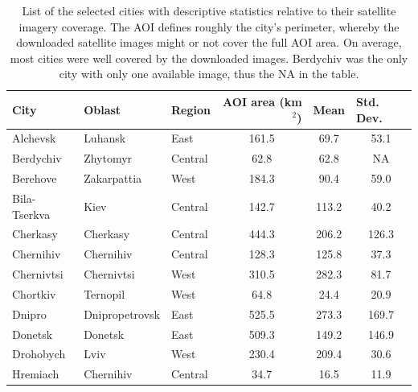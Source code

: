 \documentclass[sn-basic]{sn-jnl}%
\begin{document}
{\begin{appendices}
\begin{longtable}{lllccc}
\caption{List of the selected cities with descriptive statistics relative to their satellite imagery coverage. The AOI defines roughly the city's perimeter, whereby the downloaded satellite images might or not cover the full AOI area. On average, most cities were well covered by the downloaded images. Berdychiv was the only city with only one available image, thus the NA in the table.}
\label{SM_AOI_Table}
\\
\toprule
\multicolumn{1}{l}{\textbf{City}} & \multicolumn{1}{l}{\textbf{Oblast}} & \multicolumn{1}{l}{\textbf{Region}} & \multicolumn{1}{r}{\textbf{AOI area (km$^2$)}} & \multicolumn{1}{l}{\textbf{Mean}} & \multicolumn{1}{l}{\textbf{Std. Dev.}} \\ \midrule
Alchevsk            & Luhansk         & East    & 161.5                                & 69.7  & 53.1      \\
Berdychiv           & Zhytomyr        & Central & 62.8                                 & 62.8  & NA        \\
Berehove            & Zakarpattia     & West    & 184.3                                & 90.4  & 59.0      \\
Bila-Tserkva        & Kiev            & Central & 142.7                                & 113.2 & 40.2      \\
Cherkasy            & Cherkasy        & Central & 444.3                                & 206.2 & 126.3     \\
Chernihiv           & Chernihiv       & Central & 128.3                                & 125.8 & 37.3      \\
Chernivtsi          & Chernivtsi      & West    & 310.5                                & 282.3 & 81.7      \\
Chortkiv            & Ternopil        & West    & 64.8                                 & 24.4  & 20.9      \\
Dnipro              & Dnipropetrovsk  & East    & 525.5                                & 273.3 & 169.7     \\
Donetsk             & Donetsk         & East    & 509.3                                & 149.2 & 146.9     \\
Drohobych           & Lviv            & West    & 230.4                                & 209.4 & 30.6      \\
Hremiach            & Chernihiv       & Central & 34.7                                 & 16.5  & 11.9      \\

\end{longtable}
\end{appendices}}
\end{document}
